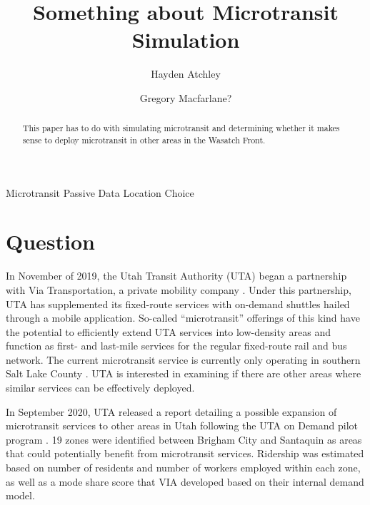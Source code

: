 \documentclass[3p, authoryear]{elsarticle} %
\begin{document}
\begin{frontmatter}

  \title{Something about Microtransit Simulation}
    \author[Brigham Young University]{Hayden Atchley}
    \author[Brigham Young University]{Gregory Macfarlane?}
      \address[Brigham Young University]{Civil and Construction Engineering Department, 430 Engineering Building, Provo, Utah 84602}
    
  \begin{abstract}
  This paper has to do with simulating microtransit and determining whether it makes sense to deploy microtransit in other areas in the Wasatch Front.
  \end{abstract}
   \begin{keyword} Microtransit Passive Data Location Choice\end{keyword}
 \end{frontmatter}

\RaggedRight

\hypertarget{question}{%
\section{Question}\label{question}}

In November of 2019, the Utah Transit Authority (UTA) began a partnership with Via Transportation, a private mobility company \citep{UTAreport}. Under this partnership, UTA has supplemented its fixed-route services with on-demand shuttles hailed through a mobile application. So-called ``microtransit'' offerings of this kind have the potential to efficiently extend UTA services into low-density areas and function as first- and last-mile services for the regular fixed-route rail and bus network. The current microtransit service is currently only operating in southern Salt Lake County \citep{UTAonDemand}. UTA is interested in examining if there are other areas where similar services can be effectively deployed.

\par

In September 2020, UTA released a report detailing a possible expansion of microtransit services to other areas in Utah following the UTA on Demand pilot program \citep{UTAreport}. 19 zones were identified between Brigham City and Santaquin as areas that could potentially benefit from microtransit services. Ridership was estimated based on number of residents and number of workers employed within each zone, as well as a mode share score that VIA developed based on their internal demand model.
\end{document}
